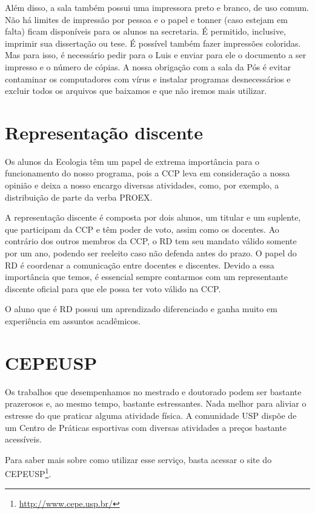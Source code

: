 \documentclass[twoside a4paper 12pt]{report}
\begin{document}
Além disso, a sala também possui uma impressora preto e branco, de uso
comum. Não há limites de impressão por pessoa e o papel e tonner (caso
estejam em falta) ficam disponíveis para os alunos na secretaria. É
permitido, inclusive, imprimir sua dissertação ou tese. É possível
também fazer impressões coloridas. Mas para isso, é necessário pedir
para o Luis e enviar para ele o documento a ser impresso e o número de
cópias. A nossa obrigação com a sala da Pós é evitar contaminar os
computadores com vírus e instalar programas desnecessários e excluir
todos os arquivos que baixamos e que não iremos mais utilizar.


\section{Representação discente}\label{representacao-discente}

Os alunos da Ecologia têm um papel de extrema importância para o
funcionamento do nosso programa, pois a CCP leva em consideração a
nossa opinião e deixa a nosso encargo diversas atividades, como, por
exemplo, a distribuição de parte da verba PROEX.

A representação discente é composta por dois alunos, um titular e um
suplente, que participam da CCP e têm poder de voto, assim como os
docentes. Ao contrário dos outros membros da CCP, o RD tem seu mandato
válido somente por um ano, podendo ser reeleito caso não defenda antes
do prazo. O papel do RD é coordenar a comunicação entre docentes e
discentes. Devido a essa importância que temos, é essencial sempre
contarmos com um representante discente oficial para que ele possa ter
voto válido na CCP.

O aluno que é RD possui um aprendizado diferenciado e ganha muito em
experiência em assuntos acadêmicos.

\section{CEPEUSP}\label{cepeusp}

Os trabalhos que desempenhamos no mestrado e doutorado podem ser
bastante prazerosos e, ao mesmo tempo, bastante estressantes. Nada
melhor para aliviar o estresse do que praticar alguma atividade
física. A comunidade USP dispõe de um Centro de Práticas esportivas
com diversas atividades a preços bastante acessíveis.

Para saber mais sobre como utilizar esse serviço, basta acessar o site do
CEPEUSP\footnote{\url{http://www.cepe.usp.br/}}.
\end{document}
